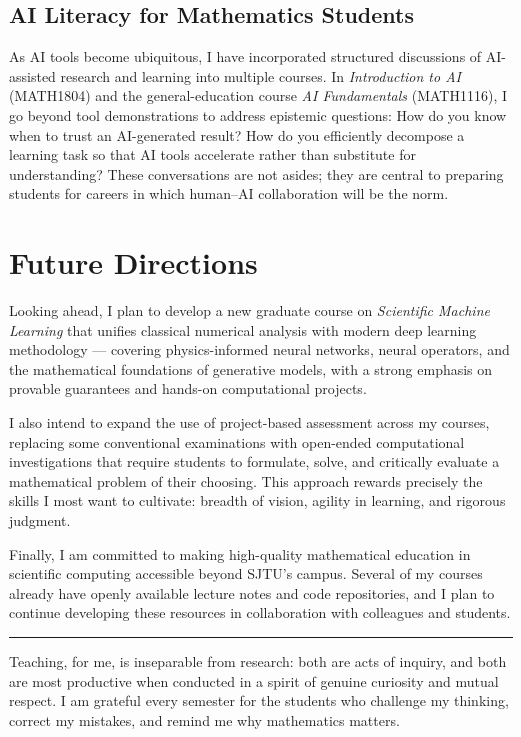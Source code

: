 \documentclass[12pt, a4paper]{article}
\begin{document}
\subsection{AI Literacy for Mathematics Students}

As AI tools become ubiquitous, I have incorporated structured discussions of
AI-assisted research and learning into multiple courses.
In \emph{Introduction to AI} (MATH1804) and the general-education course
\emph{AI Fundamentals} (MATH1116), I go beyond tool demonstrations to address
epistemic questions: How do you know when to trust an AI-generated result? How
do you efficiently decompose a learning task so that AI tools accelerate rather
than substitute for understanding?
These conversations are not asides; they are central to preparing students for
careers in which human--AI collaboration will be the norm.

\section{Future Directions}

Looking ahead, I plan to develop a new graduate course on
\emph{Scientific Machine Learning} that unifies classical numerical analysis
with modern deep learning methodology --- covering physics-informed neural
networks, neural operators, and the mathematical foundations of generative
models, with a strong emphasis on provable guarantees and
hands-on computational projects.

I also intend to expand the use of project-based assessment across my courses,
replacing some conventional examinations with open-ended computational
investigations that require students to formulate, solve, and critically
evaluate a mathematical problem of their choosing.
This approach rewards precisely the skills I most want to cultivate:
breadth of vision, agility in learning, and rigorous judgment.

Finally, I am committed to making high-quality mathematical education in
scientific computing accessible beyond SJTU's campus.
Several of my courses already have openly available lecture notes and code
repositories, and I plan to continue developing these resources in collaboration
with colleagues and students.

\vspace{1.5em}
\noindent\rule{\textwidth}{0.4pt}
\vspace{0.3em}

\noindent
{\small
  Teaching, for me, is inseparable from research: both are acts of inquiry,
  and both are most productive when conducted in a spirit of genuine curiosity
  and mutual respect.
  I am grateful every semester for the students who challenge my thinking,
  correct my mistakes, and remind me why mathematics matters.
}
\end{document}
